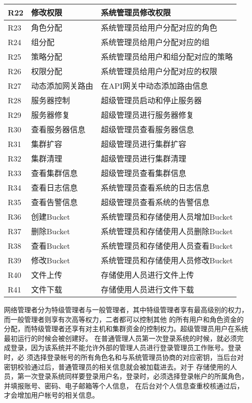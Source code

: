 \begin{center}
{{\begin{longtable}{|p{2.2cm}<{\centering}|p{3.4cm}<{\centering}|p{5.6cm}<{\centering}|}
        \hline
        R22 & 修改权限 & 系统管理员修改权限 \\
        \hline
        R23 & 角色分配 & 系统管理员给用户分配对应的角色 \\
        \hline
        R24 & 组分配 & 系统管理员给用户分配对应的组 \\
        \hline
        R25 & 策略分配 & 系统管理员给用户和组分配对应的策略 \\
        \hline
        R26 & 权限分配 & 系统管理员给用户分配对应的权限 \\
        \hline
        R27 & 动态添加网关路由 & 在API网关中动态添加路由信息 \\
        \hline
        R28 & 服务器控制 & 超级管理员启动和停止服务器 \\
        \hline
        R29 & 服务器修复 & 超级管理员进行服务器修复 \\
        \hline
        R30 & 查看服务器信息 & 超级管理员查看服务器信息 \\
        \hline
        R31 & 集群扩容 & 超级管理员进行集群扩容 \\
        \hline
        R32 & 集群清理 & 超级管理员进行集群清理 \\
        \hline
        R33 & 查看集群信息 & 超级管理员查看集群信息 \\
        \hline
        R34 & 查看日志信息 & 系统管理员查看系统的日志信息 \\
        \hline
        R35 & 查看告警信息 & 超级管理员查看系统的告警信息 \\
        \hline
        R36 & 创建Bucket & 系统管理员和存储使用人员增加Bucket \\
        \hline
        R37 & 删除Bucket & 系统管理员和存储使用人员删除Bucket \\
        \hline
        R38 & 查看Bucket & 系统管理员和存储使用人员查看Bucket \\
        \hline
        R39 & 修改Bucket & 系统管理员和存储使用人员修改Bucket \\
        \hline
        R40 & 文件上传 & 存储使用人员进行文件上传 \\
        \hline
        R41 & 文件下载 & 存储使用人员进行文件下载 \\
        \hline
	\end{longtable}}}
\end{center}

网络管理者分为特级管理者与一般管理者，其中特级管理者享有最高级别的权力，而一般管理者则享有次高等权力，二者都可以控制其他
的所有用户和角色资金的分配，而特级管理者还享有对主机和集群资金的控制权力。超级管理员用户在系统最初运行的时候会被创建好。
在普通管理人员第一次登录系统的时候，就必须完成登录，因为该系统并不能允许外部的管理人员进行登录管理员工作账号。登录时，必
须选择登录帐号的所有角色名和与系统管理员协商的对应密钥，当后台对密钥校验通过后，普通管理员的相关信息就会被加载进去。对于
存储使用的人员，第一次登录系统同样要登录用户名，登录时，必须选择登录帐户的所属角色，并填报账号、密码、电子邮箱等个人信息，
在后台对个人信息查重校核通过后，才会增加用户帐号的相关信息。

